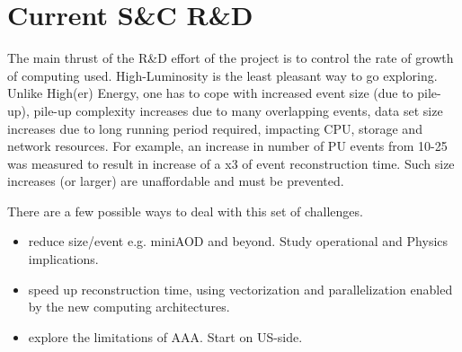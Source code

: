 \section{Current S\&C R\&D}

The main thrust of the R\&D effort of the project is to control the rate of growth of computing used.
High-Luminosity is the least pleasant way to go exploring. Unlike High(er) Energy, one has to cope with increased event size (due to pile-up), pile-up complexity increases due to many overlapping events, data set size increases due to long running period required, impacting CPU, storage and network resources. 
For example, an increase in number of PU events from 10-25 was measured to result in increase of a x3 of event reconstruction time. Such size increases (or larger) are unaffordable and must be prevented.

There are a few possible ways to deal with this set of challenges. 
\begin{itemize}
\item reduce size/event e.g. miniAOD and beyond. Study operational and Physics implications.
\item speed up reconstruction time, using vectorization and parallelization enabled by the new computing architectures. 
\item explore the limitations of AAA. Start on US-side.  
\end{itemize}

